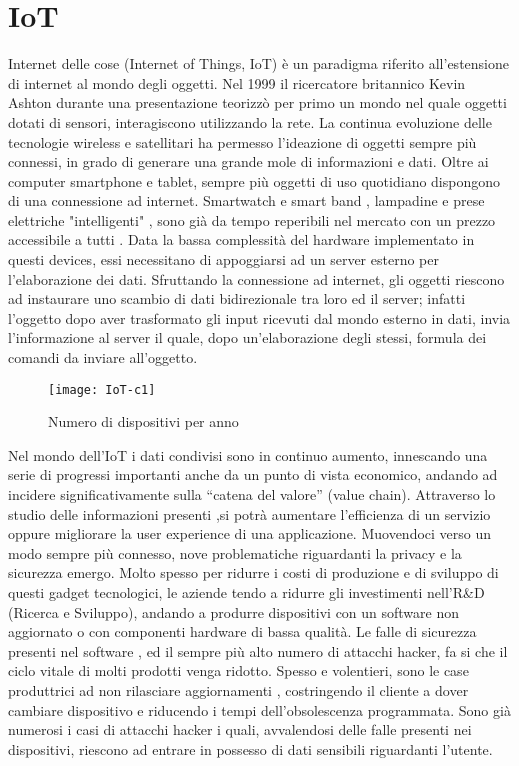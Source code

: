 \chapter{IoT}
Internet delle cose (Internet of Things, IoT) è un paradigma riferito
all’estensione di internet al mondo degli oggetti. Nel 1999 il ricercatore
britannico Kevin Ashton durante una presentazione teorizzò  per primo un mondo
nel quale oggetti dotati di sensori, interagiscono utilizzando la rete.  La
continua evoluzione delle tecnologie wireless e satellitari ha permesso
l'ideazione di oggetti sempre più connessi, in grado di generare una grande mole
di informazioni e dati. Oltre ai computer smartphone e tablet, sempre più
oggetti di uso quotidiano dispongono di una connessione ad internet. Smartwatch
e smart band , lampadine e prese elettriche "intelligenti" ,  sono già da tempo
reperibili nel mercato con un prezzo accessibile a tutti .  Data la bassa
complessità del hardware implementato in questi devices, essi necessitano di
appoggiarsi ad un server esterno per l'elaborazione dei dati.  Sfruttando la
connessione ad internet, gli oggetti riescono ad instaurare uno scambio di dati
bidirezionale tra loro ed il server; infatti l'oggetto dopo aver trasformato gli
input ricevuti dal mondo esterno in dati, invia l'informazione al server il
quale, dopo un'elaborazione degli stessi, formula dei comandi da inviare
all'oggetto.
\\
\begin{figure}[h]
        \centering 
                \texttt{[image: IoT-c1]}
        \caption{Numero di dispositivi per anno}
\end{figure}
Nel mondo dell’IoT i dati condivisi sono in continuo aumento, innescando una
serie di progressi importanti anche da un punto di vista economico, andando ad
incidere  significativamente sulla “catena del valore” (value chain). Attraverso
lo studio delle informazioni presenti ,si potrà  aumentare l’efficienza di un
servizio oppure  migliorare la user experience di una applicazione.
Muovendoci verso un modo sempre più connesso, nove problematiche riguardanti la
privacy e la sicurezza emergo.  Molto spesso per ridurre i costi di produzione e
di sviluppo di questi gadget tecnologici, le aziende tendo a ridurre gli
investimenti nell'R\&D (Ricerca e Sviluppo), andando a produrre dispositivi con
un software non aggiornato o con componenti hardware di bassa qualità. 
Le falle di sicurezza presenti nel software , ed il sempre più alto numero di
attacchi hacker, fa si che il ciclo vitale di molti prodotti venga ridotto.
Spesso e volentieri, sono le case produttrici ad non rilasciare aggiornamenti ,
costringendo il cliente a dover cambiare dispositivo e riducendo i tempi
dell'obsolescenza programmata.
 Sono già numerosi i casi di attacchi hacker i quali, avvalendosi
delle falle presenti nei dispositivi, riescono ad entrare in possesso di dati
sensibili riguardanti l'utente.

